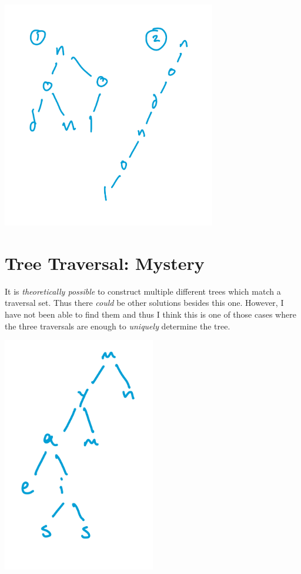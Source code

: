 \documentclass[twoside=false,DIV=14]{scrartcl}
\begin{document}
\includegraphics[width=0.7\textwidth]{nodnol.jpeg}
\section{Tree Traversal: Mystery}

\begin{note}
It is \emph{theoretically possible} to construct multiple different trees which match a traversal set.  Thus there \emph{could} be other solutions besides this one.  However, I have not been able to find them and thus I think this is one of those cases where the three traversals are enough to \emph{uniquely} determine the tree.
\end{note}

\includegraphics[width=0.5\textwidth]{mystery_tree_one.jpeg}
\end{document}
